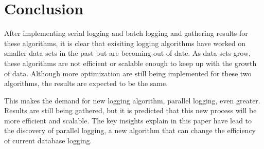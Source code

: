 \section{Conclusion}
After implementing serial logging and batch logging and gathering results for these algorithms, it is clear that exisiting logging algorithms have worked on smaller data sets in the past but are becoming out of date. As data sets grow, these algorithms are not efficient or scalable enough to keep up with the growth of data. Although more optimization are still being implemented for these two algorithms, the results are expected to be the same. \par

This makes the demand for new logging algorithm, parallel logging, even greater. Results are still being gathered, but it is predicted that this new process will be more efficient and scalable. The key insights explain in this paper have lead to the discovery of parallel logging, a new algorithm that can change the efficiency of current database logging. 
  
